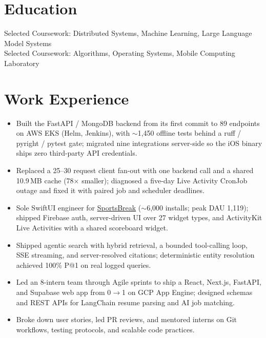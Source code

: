 \documentclass[11pt, letterpaper]{article}
\begin{document}

\section{Education}
Selected Coursework: Distributed Systems, Machine Learning, Large Language Model Systems\\[1pt]
Selected Coursework: Algorithms, Operating Systems, Mobile Computing Laboratory

\section{Work Experience}
\begin{itemize}
  \item Built the FastAPI / MongoDB backend from its first commit to 89 endpoints on AWS EKS (Helm, Jenkins), with $\sim$1{,}450 offline tests behind a ruff / pyright / pytest gate; migrated nine integrations server-side so the iOS binary ships zero third-party API credentials.
  \item Replaced a 25--30 request client fan-out with one backend call and a shared 10.9\,MB cache (78$\times$ smaller); diagnosed a five-day Live Activity CronJob outage and fixed it with paired job and scheduler deadlines.
  \item Sole SwiftUI engineer for \href{https://apps.apple.com/app/id6762649287}{SportsBreak} ($\sim$6{,}000 installs; peak DAU 1{,}119); shipped Firebase auth, server-driven UI over 27 widget types, and ActivityKit Live Activities with a shared scoreboard widget.
  \item Shipped agentic search with hybrid retrieval, a bounded tool-calling loop, SSE streaming, and server-resolved citations; deterministic entity resolution achieved 100\% P@1 on real logged queries.
\end{itemize}

\begin{itemize}
  \item Led an 8-intern team through Agile sprints to ship a React, Next.js, FastAPI, and Supabase web app from 0$\to$1 on GCP App Engine; designed schemas and REST APIs for LangChain resume parsing and AI job matching.
  \item Broke down user stories, led PR reviews, and mentored interns on Git workflows, testing protocols, and scalable code practices.
\end{itemize}
\end{document}
